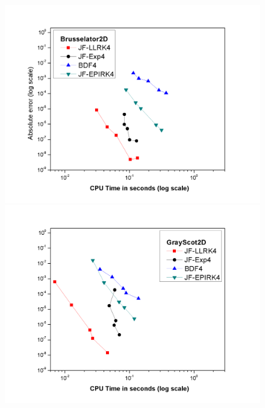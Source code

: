 \documentclass{article}
\begin{document}
\begin{figure}
\begin{minipage}{.49\textwidth}
\end{minipage}
\begin{minipage}{.5\textwidth}
	\vspace{-0.4in}
	\hspace{-0.8in}\includegraphics[scale=0.4]{Graph3.png}
\end{minipage}
\begin{minipage}{.49\textwidth}
	\vspace{-0.4in}
	\includegraphics[scale=0.4]{Graph4.png}
\end{minipage}

\end{figure}
\end{document}

